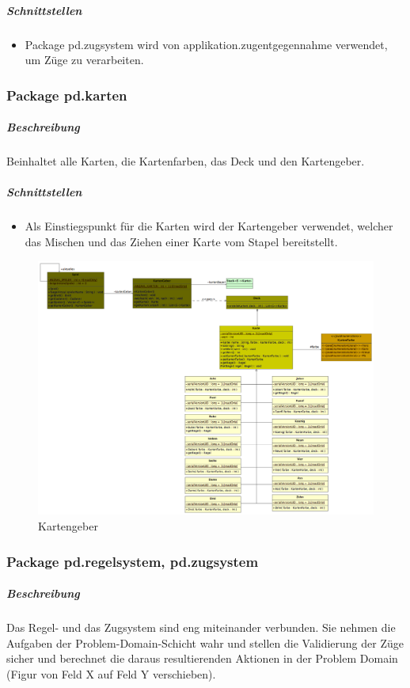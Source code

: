 \documentclass[12pt,halfparskip]{scrartcl}
\begin{document}
\subparagraph{Schnittstellen} %
\label{ssub:schnittstellen}
\begin{itemize}
	\item Package pd.zugsystem wird von applikation.zugentgegennahme verwendet, um Züge zu verarbeiten.
\end{itemize}

\subsubsection{Package pd.karten} %
\label{ssub:package_pd_karten}
\subparagraph{Beschreibung}
Beinhaltet alle Karten, die Kartenfarben, das Deck und den Kartengeber. 

\subparagraph{Schnittstellen} %
\label{ssub:schnittstellen}
\begin{itemize}
	\item Als Einstiegspunkt für die Karten wird der Kartengeber verwendet, welcher das Mischen und das Ziehen einer Karte vom Stapel bereitstellt.
\end{itemize}

\begin{figure}[h]
	\centering
	\includegraphics[width=0.8 \textwidth]{pd_kartengeber}
	\caption{Kartengeber}
	\label{fig:pd_kartengeber}
\end{figure}


\clearpage
\subsubsection{Package pd.regelsystem, pd.zugsystem} %
\label{ssub:package_pd_regelsystem}
\subparagraph{Beschreibung}
Das Regel- und das Zugsystem sind eng miteinander verbunden. Sie nehmen die Aufgaben der Problem-Domain-Schicht wahr und stellen die Validierung der Züge sicher und berechnet die daraus resultierenden Aktionen in der Problem Domain (Figur von Feld X auf Feld Y verschieben).
\end{document}
